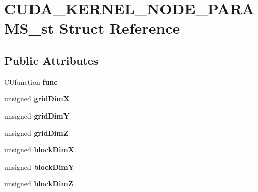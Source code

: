 \hypertarget{structCUDA__KERNEL__NODE__PARAMS__st}{}\section{C\+U\+D\+A\+\_\+\+K\+E\+R\+N\+E\+L\+\_\+\+N\+O\+D\+E\+\_\+\+P\+A\+R\+A\+M\+S\+\_\+st Struct Reference}
\label{structCUDA__KERNEL__NODE__PARAMS__st}
\subsection*{Public Attributes}
\begin{DoxyCompactItemize}
\item 
C\+Ufunction {\bfseries func}\hypertarget{structCUDA__KERNEL__NODE__PARAMS__st_adb6895080421f0e43e8519780a456a44}{}\label{structCUDA__KERNEL__NODE__PARAMS__st_adb6895080421f0e43e8519780a456a44}

\item 
unsigned {\bfseries grid\+DimX}\hypertarget{structCUDA__KERNEL__NODE__PARAMS__st_a89eff7ac5124413da685ecba68c20c72}{}\label{structCUDA__KERNEL__NODE__PARAMS__st_a89eff7ac5124413da685ecba68c20c72}

\item 
unsigned {\bfseries grid\+DimY}\hypertarget{structCUDA__KERNEL__NODE__PARAMS__st_a0e2d659cb192c55cb6fa2b06b1091c75}{}\label{structCUDA__KERNEL__NODE__PARAMS__st_a0e2d659cb192c55cb6fa2b06b1091c75}

\item 
unsigned {\bfseries grid\+DimZ}\hypertarget{structCUDA__KERNEL__NODE__PARAMS__st_a13beed48c1f130396e99c9d0d2f7f10d}{}\label{structCUDA__KERNEL__NODE__PARAMS__st_a13beed48c1f130396e99c9d0d2f7f10d}

\item 
unsigned {\bfseries block\+DimX}\hypertarget{structCUDA__KERNEL__NODE__PARAMS__st_a167a8b94f3c265aca906eb7360b3177e}{}\label{structCUDA__KERNEL__NODE__PARAMS__st_a167a8b94f3c265aca906eb7360b3177e}

\item 
unsigned {\bfseries block\+DimY}\hypertarget{structCUDA__KERNEL__NODE__PARAMS__st_a28cb5285c7964307ac3bc5e9894541c7}{}\label{structCUDA__KERNEL__NODE__PARAMS__st_a28cb5285c7964307ac3bc5e9894541c7}

\item 
unsigned {\bfseries block\+DimZ}\hypertarget{structCUDA__KERNEL__NODE__PARAMS__st_a2376d5a91e801fc69a99fcd9033d6868}{}\label{structCUDA__KERNEL__NODE__PARAMS__st_a2376d5a91e801fc69a99fcd9033d6868}


\end{DoxyCompactItemize}
